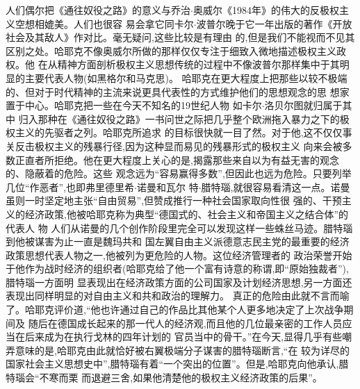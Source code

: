 ﻿\documentclass[12pt]{article}
\begin{document}
人们偶尔把《通往奴役之路》的意义与乔治$\cdot$奥威尔《1984年》的伟大的反极权主义空想相媲美。人们也很容
易会拿它同卡尔$\cdot$波普尔晚于它一年出版的著作《开放社会及其敌人》作对比。毫无疑问,这些比较是有理由
的,但是我们不能视而不见其区别之处。哈耶克不像奥威尔所做的那样仅仅专注于细致入微地描述极权主义政权。他
在从精神方面剖析极权主义思想传统的过程中不像波普尔那样集中于其明显的主要代表人物(如黑格尔和马克思)。
哈耶克在更大程度上把那些以较不极端的、但对于时代精神的主流来说更具代表性的方式维护他们的思想观念的思
想家置于中心。哈耶克把一些在今天不知名的19世纪人物 \myrule 如卡尔$\cdot$洛贝尔图就归属于其中 \myrule
归入那种在《通往奴役之路》一书问世之际把几乎整个欧洲拖入暴力之下的极权主义的先驱者之列。哈耶克所追求
的目标很快就一目了然。对于他,这不仅仅事关反击极权主义的残暴行径,因为这种显而易见的残暴形式的极权主义
向来会被多数正直者所拒绝。他在更大程度上关心的是,揭露那些来自以为有益无害的观念的、隐蔽着的危险。这些
观念远为``容易赢得多数'',但因此也远为危险。只要列举几位``作恶者'',也即弗里德里希$\cdot$诺曼和瓦尔
特$\cdot$腊特瑙,就很容易看清这一点。诺曼虽则一时坚定地主张``自由贸易'',但赞成推行一种社会国家取向性很
强的、干预主义的经济政策,他被哈耶克称为典型``德国式的、社会主义和帝国主义之结合体''的代表人
物 \myrule 人们从诺曼的几个创作阶段里完全可以发现这样一些蛛丝马迹。腊特瑙到他被谋害为止一直是魏玛共和
国左翼自由主义派德意志民主党的最重要的经济政策思想代表人物之一,他被列为更危险的人物。这位经济管理者的
政治荣誉开始于他作为战时经济的组织者(哈耶克给了他一个富有诗意的称谓,即``原始独裁者''),腊特瑙一方面明
显表现出在经济政策方面的公司国家及计划经济思想,另一方面还表现出同样明显的对自由主义和共和政治的理解力。
真正的危险由此就不言而喻了。哈耶克评价道,``他也许通过自己的作品比其他某个人更多地决定了上次战争期间及
随后在德国成长起来的那一代人的经济观,而且他的几位最亲密的工作人员应当在后来成为在执行戈林的四年计划的
官员当中的骨干。''在今天,显得几乎有些嘲弄意味的是,哈耶克由此就恰好被右翼极端分子谋害的腊特瑙断言,``在
较为详尽的国家社会主义思想史中'',腊特瑙有着``一个突出的位置''。但是,哈耶克向他承认,腊特瑙会``不寒而栗
而退避三舍,如果他清楚他的极权主义经济政策的后果''。
\end{document}
